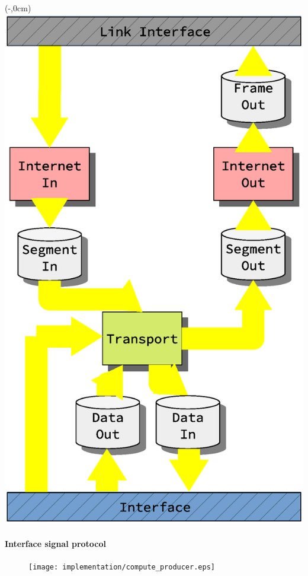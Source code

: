 \begin{frame}[fragile]
    \begin{textblock*}{\displayThumbnail}(\paperwidth-\displayThumbnail-0.2cm,0cm) %
        \colorbox{white}{\includegraphics[width=\textwidth]{implementation/design_2_busses.eps}}
    \end{textblock*}
\frametitle{\ImplementationTitle}
\framesubtitle{Interface signal protocol}
\begin{figure}
        \centering
        \texttt{[image: implementation/compute\_producer.eps]}
\end{figure}

\end{frame}




